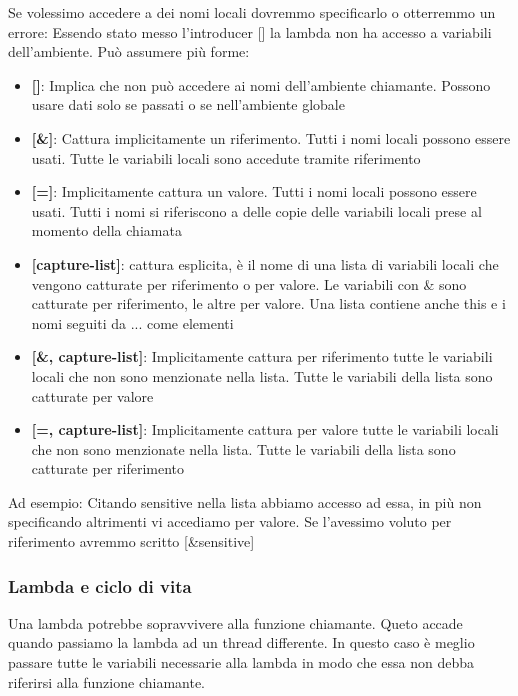 \documentclass[11pt,a4paper]{book}
\begin{document}
Se volessimo accedere a dei nomi locali dovremmo specificarlo o otterremmo un errore:
\label{code: 177}
Essendo stato messo l'introducer [] la lambda non ha accesso a variabili dell'ambiente. Può assumere più forme:
\begin{itemize}
	\item \textbf{[]}: Implica che non può accedere ai nomi dell'ambiente chiamante. Possono usare dati solo se passati o se nell'ambiente globale
	\item \textbf{[\&]}: Cattura implicitamente un riferimento. Tutti i nomi locali possono essere usati. Tutte le variabili locali sono accedute tramite riferimento
	\item \textbf{[=]}: Implicitamente cattura un valore. Tutti i nomi locali possono essere usati. Tutti i nomi si riferiscono a delle copie delle variabili locali prese al momento della chiamata
	\item \textbf{[capture-list]}: cattura esplicita, è il nome di una lista di variabili locali che vengono catturate per riferimento o per valore. Le variabili con \& sono catturate per riferimento, le altre per valore. Una lista contiene anche this e i nomi seguiti da ... come elementi
	\item \textbf{[\&, capture-list]}: Implicitamente cattura per riferimento tutte le variabili locali che non sono menzionate nella lista. Tutte le variabili della lista sono catturate per valore
	\item \textbf{[=, capture-list]}: Implicitamente cattura per valore tutte le variabili locali che non sono menzionate nella lista. Tutte le variabili della lista sono catturate per riferimento 
\end{itemize}
Ad esempio:
\label{code: 178}
Citando sensitive nella lista abbiamo accesso ad essa, in più non specificando altrimenti vi accediamo per valore. Se l'avessimo voluto per riferimento avremmo scritto [\&sensitive]

\subsubsection{Lambda e ciclo di vita}
Una lambda potrebbe sopravvivere alla funzione chiamante. Queto accade quando passiamo la lambda ad un thread differente. In questo caso è meglio passare tutte le variabili necessarie alla lambda in modo che essa non debba riferirsi alla funzione chiamante.
\end{document}
